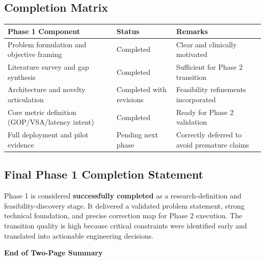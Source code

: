 \documentclass[10pt,a4paper]{article}
\begin{document}
\subsection{Completion Matrix}
\begin{table}[htbp]
\centering
\renewcommand{\arraystretch}{1.12}
\setlength{\tabcolsep}{3.5pt}
\begin{tabularx}{\textwidth}{|p{5.1cm}|p{2.2cm}|L|}
\hline
\textbf{Phase 1 Component} & \textbf{Status} & \textbf{Remarks} \\
\hline
Problem formulation and objective framing & Completed & Clear and clinically motivated \\
\hline
Literature survey and gap synthesis & Completed & Sufficient for Phase 2 transition \\
\hline
Architecture and novelty articulation & Completed with revisions & Feasibility refinements incorporated \\
\hline
Core metric definition (GOP/VSA/latency intent) & Completed & Ready for Phase 2 validation \\
\hline
Full deployment and pilot evidence & Pending next phase & Correctly deferred to avoid premature claims \\
\hline
\end{tabularx}
\end{table}

\enlargethispage{3\baselineskip}

\subsection{Final Phase 1 Completion Statement}
Phase 1 is considered \textbf{successfully completed} as a research-definition and feasibility-discovery stage. It delivered a validated problem statement, strong technical foundation, and precise correction map for Phase 2 execution. The transition quality is high because critical constraints were identified early and translated into actionable engineering decisions.

\begin{center}
\footnotesize \textbf{End of Two-Page Summary}
\end{center}
\end{document}
